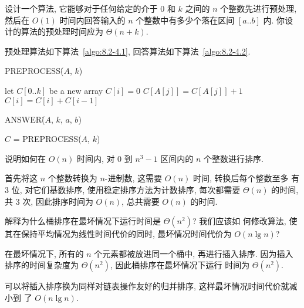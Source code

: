 \documentclass[boxes]{homework}
\begin{document}

\begin{problem}
设计一个算法, 它能够对于任何给定的介于 0 和 $k$ 之间的 $n$ 个整数先进行预处理,
然后在 $O(1)$ 时间内回答输入的 $n$ 个整数中有多少个落在区间 $[a .. b]$ 内. 你设
计的算法的预处理时间应为 $\Theta(n + k)$.
\end{problem}
\begin{solution}
    预处理算法如下算法~\ref{algo:8.2-4.1}, 回答算法如下算法~\ref{algo:8.2-4.2}.
    \begin{algo}
        \caption{PREPROCESS\.($A$, $k$)}
        \label{algo:8.2-4.1}
        let $C[0 .. k]$ be a new array\;
         {
            $C[i] = 0$\;
        }
         {
            $C[A[j]] = C[A[j]] + 1$\;
        }
         {
            $C[i] = C[i] + C[i - 1]$\;
        }
        \;
    \end{algo}
    \begin{algo}
        \caption{ANSWER\.($A$, $k$, $a$, $b$)}
        \label{algo:8.2-4.2}
        $C$ = PREPROCESS\.($A$, $k$)
    \end{algo}

\end{solution}


\begin{problem}
说明如何在 $O(n)$ 时间内, 对 0 到 $n^{3} - 1$ 区间内的 $n$ 个整数进行排序.
\end{problem}
\begin{solution}
    首先将这 $n$ 个整数转换为 $n$-进制数, 这需要 $O(n)$ 时间, 转换后每个整数至多
    有 3 位, 对它们基数排序, 使用稳定排序方法为计数排序, 每次都需要 $\Theta(n)$
    的时间, 共 3 次, 因此排序时间为 $O(n)$, 总共需要 $O(n)$ 的时间.
\end{solution}


\begin{problem}
解释为什么桶排序在最坏情况下运行时间是 $\Theta \left( n^{2}\right)$? 我们应该如
何修改算法, 使其在保持平均情况为线性时间代价的同时, 最坏情况时间代价为
$O(n\lg n)$?
\end{problem}
\begin{solution}
    在最坏情况下, 所有的 $n$ 个元素都被放进同一个桶中, 再进行插入排序. 因为插入
    排序的时间复杂度为 $\Theta \left( n^{2}\right)$, 因此桶排序在最坏情况下运行
    时间为 $\Theta \left( n^{2}\right)$.

    可以将插入排序换为同样对链表操作友好的归并排序, 这样最坏情况时间代价就减小到
    了 $O(n\lg n)$.
\end{solution}
\end{document}
